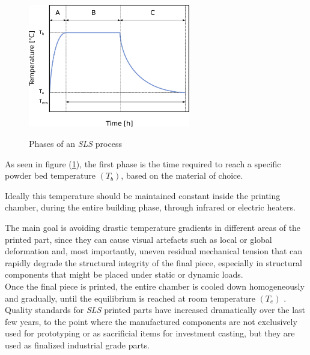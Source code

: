 \documentclass{article}
\begin{document}
    \begin{figure}[h!]
        \centering
        \includegraphics[width=0.63\textwidth]{Pictures/SLS_temp_over_time.eps}\\
        \caption{Phases of an \textit{SLS} process \autocites{Inkscape}{Padovano_SLS_Review}} 
        \label{fig:SLS_temp_over_time}
    \end{figure}

    As seen in figure (\ref{fig:SLS_temp_over_time}), the first phase is the time required to reach a specific powder bed temperature $(T_b)$, based on the material of choice. 

    Ideally this temperature should be maintained constant inside the printing
    chamber, during the entire building phase, through infrared or electric heaters. 
    
    The main goal is avoiding drastic temperature gradients in different areas of the printed part, since they can cause 
    visual artefacts such as local or global deformation and, most importantly, uneven residual mechanical tension that can 
    rapidly degrade the structural integrity of the final piece, especially in structural components that might be placed under static or
    dynamic loads. \\ 
    
    Once the final piece is printed, the entire chamber is cooled down homogeneously and gradually, until the equilibrium is reached at room 
    temperature $(T_e)$ \autocite*{Padovano_SLS_Review}. \\ 

    Quality standards for \textit{SLS} printed parts have increased dramatically over the last few years, to the point where 
    the manufactured components are not exclusively used for prototyping or as sacrificial items for investment casting, but they are 
    used as finalized industrial grade parts. 
\end{document}
